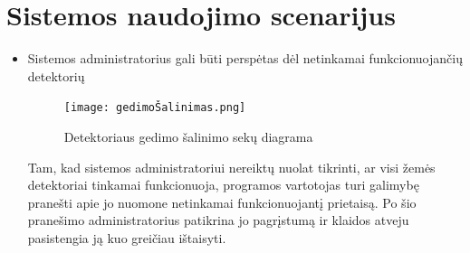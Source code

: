 \documentclass[oneside]{VUMIFPSkursinis}
\begin{document}
\section{Sistemos naudojimo scenarijus}
\begin{itemize}
\item Sistemos administratorius gali būti perspėtas dėl netinkamai funkcionuojančių detektorių
\begin{figure}[H]
		\centering	
	\texttt{[image: gedimoŠalinimas.png]}
	\caption{Detektoriaus gedimo šalinimo sekų diagrama}
	\label{fig:gedimoŠalinimas}
	\end{figure}
	Tam, kad sistemos administratoriui nereiktų nuolat tikrinti, ar visi žemės detektoriai tinkamai funkcionuoja, programos vartotojas turi galimybę pranešti apie jo nuomone netinkamai funkcionuojantį prietaisą. Po šio pranešimo administratorius patikrina jo pagrįstumą ir klaidos atveju pasistengia ją kuo greičiau ištaisyti.
\end{itemize}
\end{document}
